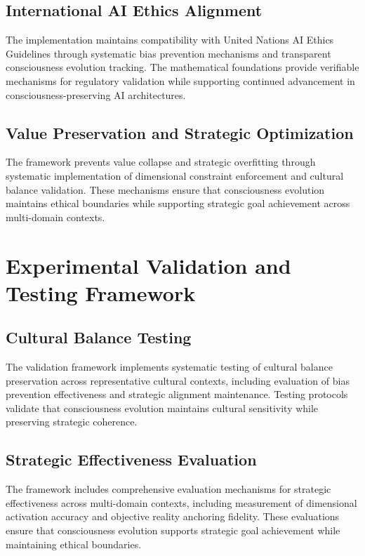 \documentclass[12pt]{article}
\begin{document}
\subsection{International AI Ethics Alignment}

The implementation maintains compatibility with United Nations AI Ethics Guidelines through systematic bias prevention mechanisms and transparent consciousness evolution tracking. The mathematical foundations provide verifiable mechanisms for regulatory validation while supporting continued advancement in consciousness-preserving AI architectures.

\subsection{Value Preservation and Strategic Optimization}

The framework prevents value collapse and strategic overfitting through systematic implementation of dimensional constraint enforcement and cultural balance validation. These mechanisms ensure that consciousness evolution maintains ethical boundaries while supporting strategic goal achievement across multi-domain contexts.

\section{Experimental Validation and Testing Framework}

\subsection{Cultural Balance Testing}

The validation framework implements systematic testing of cultural balance preservation across representative cultural contexts, including evaluation of bias prevention effectiveness and strategic alignment maintenance. Testing protocols validate that consciousness evolution maintains cultural sensitivity while preserving strategic coherence.

\subsection{Strategic Effectiveness Evaluation}

The framework includes comprehensive evaluation mechanisms for strategic effectiveness across multi-domain contexts, including measurement of dimensional activation accuracy and objective reality anchoring fidelity. These evaluations ensure that consciousness evolution supports strategic goal achievement while maintaining ethical boundaries.
\end{document}
